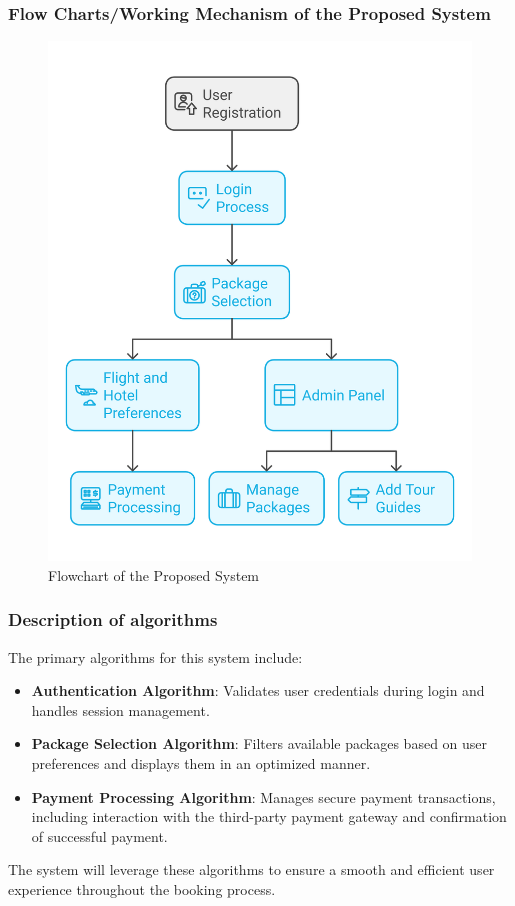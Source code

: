 \subsubsection{Flow Charts/Working Mechanism of the Proposed System}
\begin{figure}[H]  %
    \centering
    \includegraphics[width=0.5\linewidth]{./Images/flow2.png}
    \caption{Flowchart of the Proposed System}
    \label{fig:system_flowchart}
\end{figure}

\subsubsection{Description of algorithms}
The primary algorithms for this system include:
\begin{itemize}
    \item \textbf{Authentication Algorithm}: Validates user credentials during login and handles session management.
    \item \textbf{Package Selection Algorithm}: Filters available packages based on user preferences and displays them in an optimized manner.
    \item \textbf{Payment Processing Algorithm}: Manages secure payment transactions, including interaction with the third-party payment gateway and confirmation of successful payment.
\end{itemize}
The system will leverage these algorithms to ensure a smooth and efficient user experience throughout the booking process.